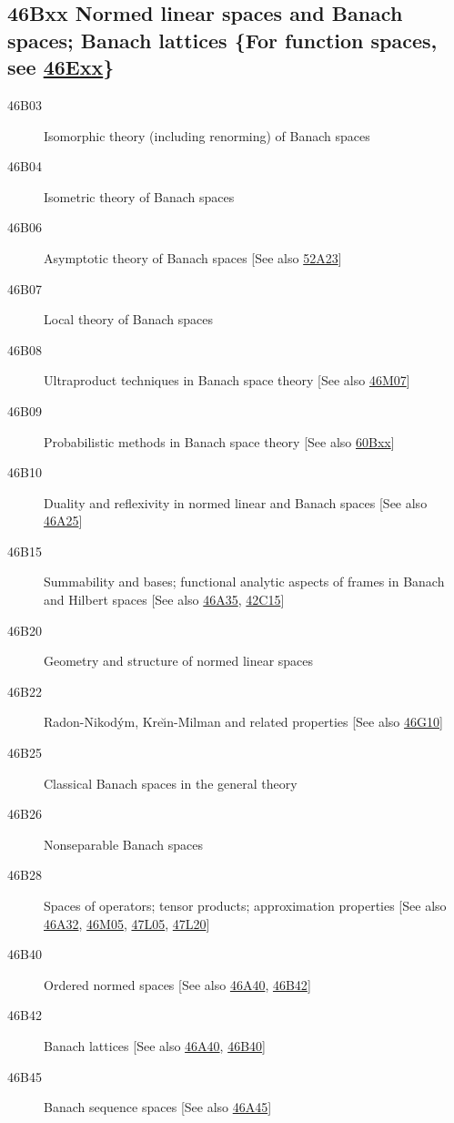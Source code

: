 \subsection*{46Bxx  Normed linear spaces and Banach spaces; Banach lattices \{For function spaces, see \hyperref[46Exx]{46Exx}\} }\label{46Bxx}
\begin{description}  
\item [46B03]\label{46B03} Isomorphic theory (including renorming) of Banach spaces
\item [46B04]\label{46B04} Isometric theory of Banach spaces
\item [46B06]\label{46B06} Asymptotic theory of Banach spaces [See also \hyperref[52A23]{52A23}]
\item [46B07]\label{46B07} Local theory of Banach spaces
\item [46B08]\label{46B08} Ultraproduct techniques in Banach space theory [See also \hyperref[46M07]{46M07}]
\item [46B09]\label{46B09} Probabilistic methods in Banach space theory [See also \hyperref[60Bxx]{60Bxx}]
\item [46B10]\label{46B10} Duality and reflexivity in normed linear and Banach spaces [See also \hyperref[46A25]{46A25}]
\item [46B15]\label{46B15} Summability and bases; functional analytic aspects of frames in Banach and Hilbert spaces [See also \hyperref[46A35]{46A35}, \hyperref[42C15]{42C15}]
\item [46B20]\label{46B20} Geometry and structure of normed linear spaces
\item [46B22]\label{46B22} Radon-Nikod\'{y}m, Kre\u{\i}n-Milman and related properties [See also \hyperref[46G10]{46G10}]
\item [46B25]\label{46B25} Classical Banach spaces in the general theory
\item [46B26]\label{46B26} Nonseparable Banach spaces
\item [46B28]\label{46B28} Spaces of operators; tensor products; approximation properties [See also \hyperref[46A32]{46A32}, \hyperref[46M05]{46M05}, \hyperref[47L05]{47L05}, \hyperref[47L20]{47L20}]
\item [46B40]\label{46B40} Ordered normed spaces [See also \hyperref[46A40]{46A40}, \hyperref[46B42]{46B42}]
\item [46B42]\label{46B42} Banach lattices [See also \hyperref[46A40]{46A40}, \hyperref[46B40]{46B40}]
\item [46B45]\label{46B45} Banach sequence spaces [See also \hyperref[46A45]{46A45}]

\end{description}
